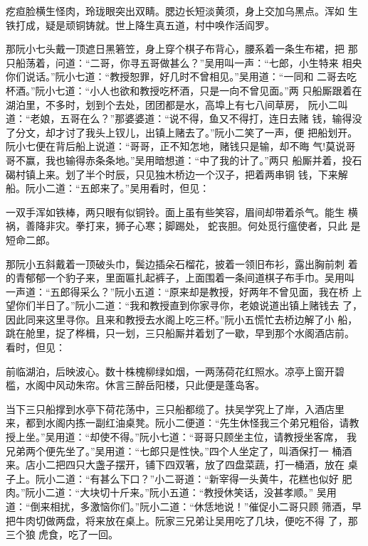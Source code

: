 疙疸脸横生怪肉，玲珑眼突出双睛。腮边长短淡黄须，身上交加乌黑点。浑如
生铁打成，疑是顽铜铸就。世上降生真五道，村中唤作活阎罗。

那阮小七头戴一顶遮日黑箬笠，身上穿个棋子布背心，腰系着一条生布裙，把
那只船荡着，问道：“二哥，你寻五哥做甚么？”吴用叫一声：“七郎，小生特来
相央你们说话。”阮小七道：“教授恕罪，好几时不曾相见。”吴用道：“一同和
二哥去吃杯酒。”阮小七道：“小人也欲和教授吃杯酒，只是一向不曾见面。”两
只船厮跟着在湖泊里，不多时，划到个去处，团团都是水，高埠上有七八间草房，
阮小二叫道：“老娘，五哥在么？”那婆婆道：“说不得，鱼又不得打，连日去赌
钱，输得没了分文，却才讨了我头上钗儿，出镇上赌去了。”阮小二笑了一声，便
把船划开。阮小七便在背后船上说道：“哥哥，正不知怎地，赌钱只是输，却不晦
气!莫说哥哥不赢，我也输得赤条条地。”吴用暗想道：“中了我的计了。”两只
船厮并着，投石碣村镇上来。划了半个时辰，只见独木桥边一个汉子，把着两串铜
钱，下来解船。阮小二道：“五郎来了。”吴用看时，但见：

一双手浑如铁棒，两只眼有似铜铃。面上虽有些笑容，眉间却带着杀气。能生
横祸，善降非灾。拳打来，狮子心寒；脚踢处，蛇丧胆。何处觅行瘟使者，只此
是短命二郎。

那阮小五斜戴着一顶破头巾，鬓边插朵石榴花，披着一领旧布衫，露出胸前刺
着的青郁郁一个豹子来，里面匾扎起裤子，上面围着一条间道棋子布手巾。吴用叫
一声道：“五郎得采么？”阮小五道：“原来却是教授，好两年不曾见面，我在桥
上望你们半日了。”阮小二道：“我和教授直到你家寻你，老娘说道出镇上赌钱去
了，因此同来这里寻你。且来和教授去水阁上吃三杯。”阮小五慌忙去桥边解了小
船，跳在舱里，捉了桦楫，只一划，三只船厮并着划了一歇，早到那个水阁酒店前。
看时，但见：

前临湖泊，后映波心。数十株槐柳绿如烟，一两荡荷花红照水。凉亭上窗开碧
槛，水阁中风动朱帘。休言三醉岳阳楼，只此便是蓬岛客。

当下三只船撑到水亭下荷花荡中，三只船都缆了。扶吴学究上了岸，入酒店里
来，都到水阁内拣一副红油桌凳。阮小二便道：“先生休怪我三个弟兄粗俗，请教
授上坐。”吴用道：“却使不得。”阮小七道：“哥哥只顾坐主位，请教授坐客席，
我兄弟两个便先坐了。”吴用道：“七郎只是性快。”四个人坐定了，叫酒保打一
桶酒来。店小二把四只大盏子摆开，铺下四双箸，放了四盘菜蔬，打一桶酒，放在
桌子上。阮小二道：“有甚么下口？”小二哥道：“新宰得一头黄牛，花糕也似好
肥肉。”阮小二道：“大块切十斤来。”阮小五道：“教授休笑话，没甚孝顺。”
吴用道：“倒来相扰，多激恼你们。”阮小二道：“休恁地说！”催促小二哥只顾
筛酒，早把牛肉切做两盘，将来放在桌上。阮家三兄弟让吴用吃了几块，便吃不得
了，那三个狼虎食，吃了一回。

